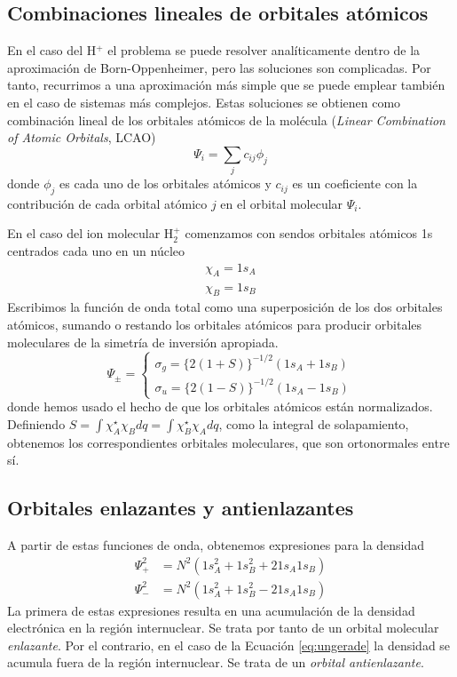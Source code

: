 \subsection{Combinaciones lineales de orbitales atómicos}
En el caso del H$^+$ el problema se puede
resolver analíticamente dentro de la aproximación de 
Born-Oppenheimer, pero las soluciones son complicadas.
Por tanto, recurrimos a una aproximación más simple que
se puede emplear también en el caso de sistemas más 
complejos. Estas soluciones se obtienen como combinación
lineal de los orbitales atómicos de la molécula 
(\textit{Linear Combination of Atomic Orbitals}, LCAO)
\begin{equation}
\Psi_i=\sum_jc_{ij}\phi_j
\end{equation}
donde $\phi_j$ es cada uno de los orbitales atómicos y 
$c_{ij}$ es un coeficiente con la contribución de cada
orbital atómico $j$ en el orbital molecular $\Psi_i$.

En el caso del ion molecular H$_2^+$ comenzamos con sendos 
orbitales atómicos 1s centrados cada uno en un núcleo
\begin{gather*}
    \chi_A =1s_A\\
    \chi_B=1s_B
\end{gather*}
Escribimos la función de onda total como una
superposición de los dos orbitales atómicos, sumando o 
restando los orbitales atómicos para producir orbitales
moleculares de la simetría de inversión apropiada.
\begin{equation}
\Psi_\pm = %
\begin{cases}
\sigma_g=\{2(1+S)\}^{-1/2}(1s_A+1s_B)\\
\sigma_u=\{2(1-S)\}^{-1/2}(1s_A-1s_B)
\end{cases}
\end{equation}
donde hemos usado el hecho de que los orbitales atómicos
están normalizados. Definiendo  $S=\int\chi_A^\star\chi_Bdq=\int\chi_B^\star\chi_Adq$, como
la integral de solapamiento, obtenemos los correspondientes
orbitales moleculares, que son ortonormales entre sí. 

\subsection{Orbitales enlazantes y antienlazantes}
A partir de estas funciones de onda, obtenemos expresiones 
para la densidad
\begin{align}
    \Psi^2_+ &= N^2(1s^2_A+1s^2_B+21s_A1s_B)\\
    \Psi^2_- &= N^2(1s^2_A+1s^2_B-21s_A1s_B) 
    \label{eq:ungerade}
\end{align}
La primera de estas expresiones resulta en una acumulación
de la densidad electrónica en la región internuclear. Se
trata por tanto de un orbital molecular \textit{enlazante}.
Por el contrario, en el caso de la Ecuación \ref{eq:ungerade} 
la densidad se acumula fuera de la región internuclear. Se
trata de un \textit{orbital antienlazante}. 

